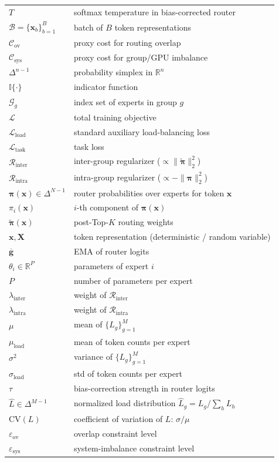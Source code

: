 \documentclass[sigconf,nonacm]{acmart}
\begin{document}
\begin{table}[!htbp]
\begin{tabular}{p{}p{}}
$T$ & softmax temperature in bias-corrected router \\
$\mathcal{B}=\{\mathbf{x}_b\}_{b=1}^B$ & batch of $B$ token representations \\
$\mathcal{C}_{\text{ov}}$ & proxy cost for routing overlap \\
$\mathcal{C}_{\text{sys}}$ & proxy cost for group/GPU imbalance \\
$\Delta^{n-1}$ & probability simplex in $\mathbb{R}^n$ \\
$\mathbb{I}\{\cdot\}$ & indicator function \\
$\mathcal{G}_g$ & index set of experts in group $g$ \\
$\mathcal{L}$ & total training objective\\
$\mathcal{L}_{\text{load}}$ & standard auxiliary load-balancing loss \\
$\mathcal{L}_{\text{task}}$ & task loss \\
$\mathcal{R}_{\text{inter}}$ & inter-group regularizer ($\propto\|\widetilde{\bm{\pi}}\|_2^2$) \\
$\mathcal{R}_{\text{intra}}$ & intra-group regularizer ($\propto-\|\bm{\pi}\|_2^2$) \\
$\bm{\pi}(\mathbf{x})\in\Delta^{N-1}$ & router probabilities over experts for token $\mathbf{x}$ \\
$\pi_i(\mathbf{x})$ & $i$-th component of $\bm{\pi}(\mathbf{x})$ \\
$\widetilde{\bm{\pi}}(\mathbf{x})$ & post-Top-$K$ routing weights  \\
$\mathbf{x},\mathbf{X}$ & token representation (deterministic / random variable) \\
$\overline{\mathbf{g}}$ & EMA of router logits \\
$\theta_i\in\mathbb{R}^P$ & parameters of expert $i$ \\
$P$ & number of parameters per expert \\
$\lambda_{\text{inter}}$ & weight of $\mathcal{R}_{\text{inter}}$ \\
$\lambda_{\text{intra}}$ & weight of $\mathcal{R}_{\text{intra}}$ \\
$\mu$ & mean of $\{L_g\}_{g=1}^M$ \\
$\mu_{\text{load}}$ & mean of token counts per expert \\
$\sigma^2$ & variance of $\{L_g\}_{g=1}^M$ \\
$\sigma_{\text{load}}$ & std of token counts per expert \\
$\tau$ & bias-correction strength in router logits \\
$\widehat L\in\Delta^{M-1}$ & normalized load distribution $\widehat L_g=L_g/\sum_h L_h$ \\
$\mathrm{CV}(L)$ & coefficient of variation of $L$: $\sigma/\mu$ \\
$\varepsilon_{\text{ov}}$ & overlap constraint level \\
$\varepsilon_{\text{sys}}$ & system-imbalance constraint level \\
\bottomrule
\end{tabular}
\end{table}
\normalsize
\end{document}
